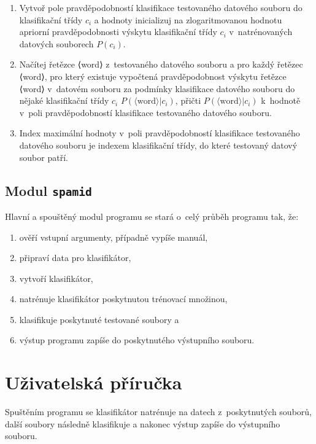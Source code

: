 \documentclass[a4paper, 12pt]{report}
\begin{document}
\begin{enumerate}
    \item Vytvoř pole pravděpodobností klasifikace testovaného datového 
souboru do klasifikační třídy $c_i$ a hodnoty inicializuj na 
zlogaritmovanou hodnotu apriorní pravděpodobnosti výskytu klasifikační 
třídy $c_i$ v~natrénovaných datových souborech $P(c_i)$.

    \item Načítej řetězce ⟨word⟩ z~testovaného datového souboru a pro 
každý řetězec ⟨word⟩, pro který existuje vypočtená pravděpodobnost výskytu 
řetězce ⟨word⟩ v~datovém souboru za podmínky klasifikace datového souboru 
do nějaké klasifikační třídy $c_i$ $P(\langle \text{word} \rangle|c_i)$, 
přičti $P(\langle \text{word} \rangle|c_i)$ k~hodnotě v~poli 
pravděpodobností klasifikace testovaného datového souboru.

    \item Index maximální hodnoty v~poli pravděpodobností klasifikace 
testovaného datového souboru je indexem klasifikační třídy, do které 
testovaný datový soubor patří.
\end{enumerate}

\section{Modul \texttt{spamid}}

Hlavní a spouštěný modul programu se stará o~celý průběh programu tak, že:

\begin{enumerate}
    \item ověří vstupní argumenty, případně vypíše manuál,
    \item připraví data pro klasifikátor,
    \item vytvoří klasifikátor,
    \item natrénuje klasifikátor poskytnutou trénovací množinou,
    \item klasifikuje poskytnuté testované soubory a
    \item výstup programu zapíše do poskytnutého výstupního souboru.
\end{enumerate}

\chapter{Uživatelská příručka}

Spuštěním programu se klasifikátor natrénuje na datech z~poskytnutých 
souborů, další soubory následně klasifikuje a nakonec výstup zapíše do 
výstupního souboru.
\end{document}
